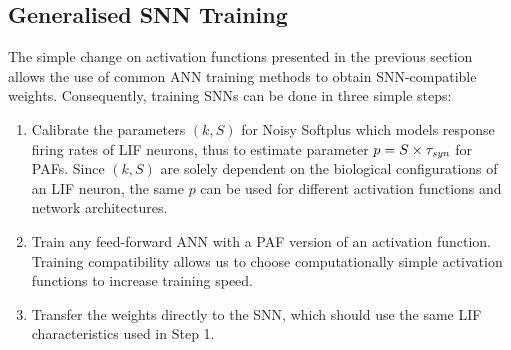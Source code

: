 \documentclass[10pt,journal,compsoc]{IEEEtran}
\begin{document}
	\subsection{Generalised SNN Training}
	\label{subsec:ns_train}

	The simple change on activation functions presented in the previous section allows the use of common ANN training methods to obtain SNN-compatible weights.
	Consequently, training SNNs can be done in three simple steps: 
	\begin{enumerate}
		\item Calibrate the parameters $(k, S)$ for Noisy Softplus which models response firing rates of LIF neurons, thus to estimate parameter $p=S \times \tau_{\textit{\textrm{syn}}}$ for PAFs. Since $(k, S)$ are solely dependent on the biological configurations of an LIF neuron, the same $p$ can be used for different activation functions and network architectures.
		\item Train any feed-forward ANN with a PAF version of an activation function.
		Training compatibility allows us to choose computationally simple activation functions to increase training speed.
		\item Transfer the weights directly to the SNN, which should use the same LIF characteristics used in Step 1.
	\end{enumerate}

	
	
	
	
\end{document}
